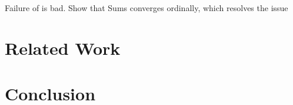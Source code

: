 \begin{notes}
    Failure of \disjointindependence{} is bad. Show that Sums converges
    ordinally, which resolves the issue
\end{notes}

\section{Related Work}

\section{Conclusion}






